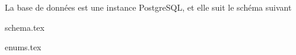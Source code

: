 La base de données est une instance PostgreSQL, et elle suit le schéma suivant

{schema.tex}

{enums.tex}